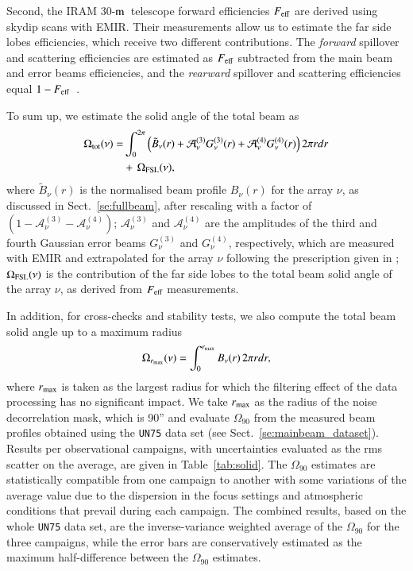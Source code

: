 \documentclass[traditionalabstract]{aa}
\newcommand{\trentemetre}{30-$\rm{m}$}
\newcommand{\rev}[1]{#1}
\begin{document}
{\rev Second, the IRAM \trentemetre\ telescope forward efficiencies
$F_{\rm{eff}}$ are derived using skydip scans with EMIR. Their
measurements allow us to estimate the far side lobes efficiencies,
which receive two different contributions. The \emph{forward}
spillover and scattering efficiencies are estimated as $F_{\rm{eff}}$
subtracted from the main beam and error beams efficiencies, and
the \emph{rearward} spillover and scattering efficiencies equal
$1-F_{\rm{eff}}$~\citep{Kramer2013}.}

{\rev To sum up, we estimate the solid angle of the total beam as
\begin{equation}
\begin{split}
  \Omega_{\rm{tot}}(\nu) =& \int_0^{2\pi} \left( \tilde{B}_{\nu}(r)
  + \mathcal{A}_{\nu}^{(3)} G_{\nu}^{(3)}(r) + \mathcal{A}_{\nu}^{(4)}
  G_{\nu}^{(4)}(r) \right)  2 \pi r dr  \\
  &+ \,  \Omega_{\rm{FSL}}
  (\nu),
  \end{split}
  \label{eq:omega_tot}
\end{equation}
where $\tilde{B}_{\nu}(r)$ is the normalised beam profile $B_{\nu}(r)$
for the array $\nu$, as discussed in Sect.~\ref{se:fullbeam}, after
rescaling with a factor of
$(1-\mathcal{A}_{\nu}^{(3)}-\mathcal{A}_{\nu}^{(4)})$; 
$\mathcal{A}_{\nu}^{(3)}$ and $\mathcal{A}_{\nu}^{(4)}$ are the
amplitudes of the third and fourth Gaussian error beams
$G_{\nu}^{(3)}$ and $G_{\nu}^{(4)}$, respectively, which are measured
with EMIR and extrapolated for the array $\nu$ following the
prescription given in \citet{Kramer2013}; $\Omega_{\rm{FSL}} (\nu)$ is
the contribution of the far side lobes to the total beam solid angle
of the array $\nu$, as derived from $F_{\rm{eff}}$ measurements.}

{\rev In addition, for cross-checks and stability tests, we also compute the
total beam solid angle up to a maximum radius
\begin{equation}
 \Omega_{r_{\rm{max}}} (\nu) = \int_0^{r_{\rm max}} B_{\nu}(r)  \,  2 \pi r dr, 
\label{eq:omega_rmax}
\end{equation}
where $r_{\rm{max}}$ is taken as the largest radius for which the
filtering effect of the data processing has no significant impact.
We take $r_{\rm{max}}$ as the radius of the noise decorrelation mask,
which is 90'' and evaluate {\rev $\Omega_{90}$} from the measured beam profiles
obtained using the {\tt UN75} data set (see Sect.~\ref{se:mainbeam_dataset}).
Results per observational campaigns, with uncertainties evaluated
as the rms scatter on the average, are given in
Table~\ref{tab:solid}. The $\Omega_{90}$ estimates are statistically
compatible from one campaign to another with some variations of the
average value due to the dispersion in the focus settings and
atmospheric conditions that prevail during each campaign. The combined
results, based on the whole {\tt UN75} data set, are the
inverse-variance weighted average of the $\Omega_{90}$ for the three
campaigns, while the error bars are conservatively estimated as the
maximum half-difference between the $\Omega_{90}$ estimates.}
  
\end{document}
